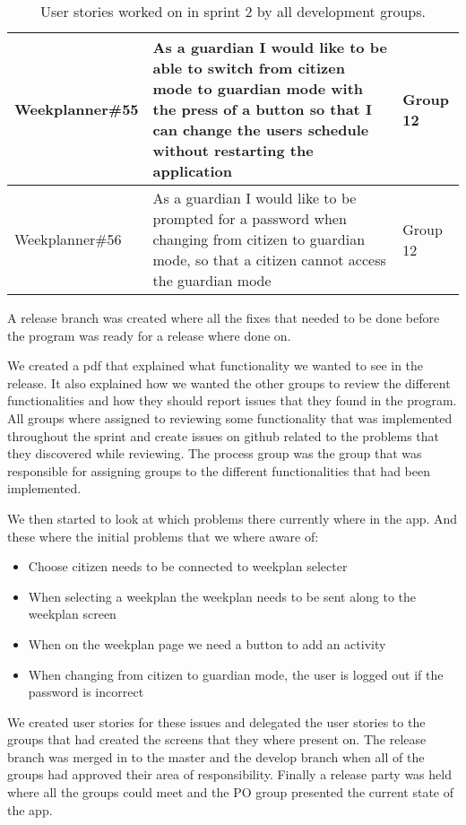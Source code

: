 \begin{table}[H]
\begin{tabular}{|p{2.8cm}|p{7cm}|p{2cm}|}
    Weekplanner\#55 & As a guardian I would like to be able to switch from citizen mode to guardian mode with the press of a button so that I can change the users schedule without restarting the application & Group 12            \\ \hline
    Weekplanner\#56 & As a guardian I would like to be prompted for a password when changing from citizen to guardian mode, so that a citizen cannot access the guardian mode                                  & Group 12            \\ \hline

    \end{tabular}
    \caption{User stories worked on in sprint 2 by all development groups.}\label{table:user-stories-sprint-2-release}
\end{table}

\noindent A release branch was created where all the fixes that needed to be done before the program was ready for a release where done on. 

\noindent We created a pdf that explained what functionality we wanted to see in the release. It also explained how we wanted the other groups to review the different functionalities and how they should report issues that they found in the program.
All groups where assigned to reviewing some functionality that was implemented throughout the sprint and create issues on github related to the problems that they discovered while reviewing. 
The process group was the group that was responsible for assigning groups to the different functionalities that had been implemented. 

\noindent We then started to look at which problems there currently where in the app. And these where the initial problems that we where aware of:
\begin{itemize}
    \item Choose citizen needs to be connected to weekplan selecter
    \item When selecting a weekplan the weekplan needs to be sent along to the weekplan screen
    \item When on the weekplan page we need a button to add an activity
    \item When changing from citizen to guardian mode, the user is logged   out if the password is incorrect
\end{itemize}

\noindent We created user stories for these issues and delegated the user stories to the groups that had created the screens that they where present on. 
The release branch was merged in to the master and the develop branch when all of the groups had approved their area of responsibility. 
Finally a release party was held where all the groups could meet and the PO group presented the current state of the app.
